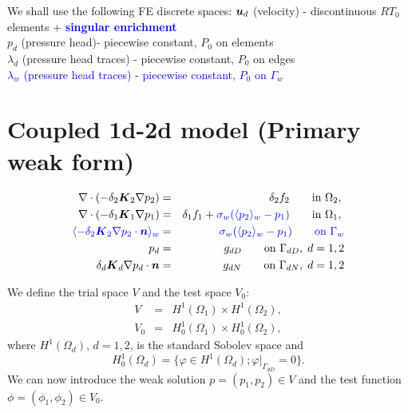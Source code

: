 We shall use the following FE discrete spaces:
$\mathbf{\boldsymbol{u}}_d$ (velocity) - discontinuous $RT_0$ elements + \textcolor{blue}{\bf singular enrichment}\\
$p_d$ (pressure head)- piecewise constant, $P_0$ on elements \\
$\lambda_d$ (pressure head traces) - piecewise constant, $P_0$ on edges \\
\textcolor{blue}{$\lambda_w$ (pressure head traces) - piecewise constant, $P_0$ on $\Gamma_w$}



\section{Coupled 1d-2d model (Primary weak form)}

\begin{eqnarray}
\nabla \cdot \left( -\delta_2 \mathbf{\boldsymbol{K}}_2 \nabla p_2 \right) &=& \delta_2 f_2 \qquad \textrm{in } \Omega_2,\;  \\
\nabla \cdot \left( -\delta_1 \mathbf{\boldsymbol{K}}_1 \nabla p_1 \right) &=& \delta_1 f_1 + {\color{blue}\sigma_w(\langle p_2\rangle_w-p_1)} \qquad \textrm{in } \Omega_1,\;  \\
\color{blue}\langle-\delta_2 \mathbf{\boldsymbol{K}}_2 \nabla p_2 \cdot \mathbf{\boldsymbol{n}}\rangle_w &=& \color{blue}\sigma_w (\langle p_2\rangle_w - p_{1}) \qquad \textrm{on } \Gamma_w\\
p_d &=& g_{dD} \qquad \textrm{on } \Gamma_{dD},\; d=1,2 \\
\delta_d \mathbf{\boldsymbol{K}}_d \nabla p_d \cdot \mathbf{\boldsymbol{n}} &=& g_{dN} \qquad \textrm{on } \Gamma_{dN},\; d=1,2
  \end{eqnarray}


We define the trial space $V$ and the test space $V_0$:
\begin{eqnarray} \label{eqn:spaces}
  V &=& H^1(\Omega_1)\times H^1(\Omega_2), \\
  V_0 &=& H^1_0(\Omega_1)\times H^1_0(\Omega_2),
\end{eqnarray}
where $H^1(\Omega_d)$, $d=1,2$, is the standard Sobolev space and 
\[ H^1_0(\Omega_d)=\{\varphi\in H^1(\Omega_d); \varphi|_{\Gamma_{dD}}=0\}. \]
We can now introduce the weak solution $p=(p_1,p_2)\in V$ and the test function $\phi=(\phi_1,\phi_2)\in V_0$.

